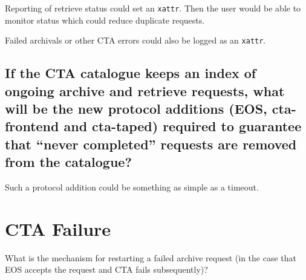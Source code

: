 Reporting of retrieve status could set an \texttt{xattr}. Then the user would be able to monitor status which could
reduce duplicate requests.

Failed archivals or other CTA errors could also be logged as an \texttt{xattr}.

\subsection{If the CTA catalogue keeps an index of ongoing archive and retrieve requests, what will be the new
protocol additions (EOS, cta-frontend and cta-taped) required to guarantee that ``never completed'' requests are removed
from the catalogue?}

Such a protocol addition could be something as simple as a timeout.
                     
%
% 


\section{CTA Failure}

What is the mechanism for restarting a failed archive request (in the case that EOS accepts the request and CTA fails
subsequently)?

